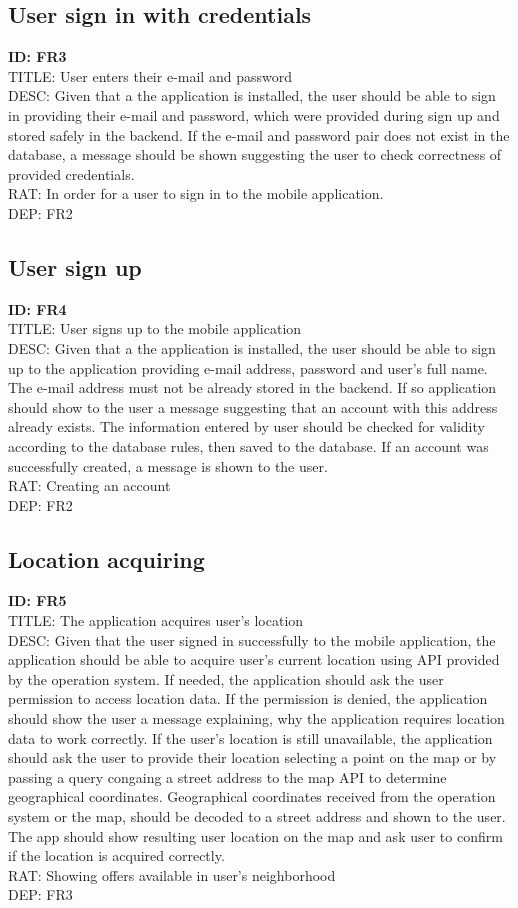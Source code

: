 \documentclass{scrreprt}
\begin{document}
\subsection{User sign in with credentials}
\textbf{ID: FR3}\\
TITLE: User enters their e-mail and password\\
DESC: Given that a the application is installed, the user should be able to sign in providing their e-mail and password, which were provided during sign up and stored safely in the backend. If the e-mail and password pair does not exist in the database, a message should be shown suggesting the user to check correctness of provided credentials.\\
RAT: In order for a user to sign in to the mobile application.\\
DEP: FR2

\subsection{User sign up}
\textbf{ID: FR4}\\
TITLE: User signs up to the mobile application\\
DESC: Given that a the application is installed, the user should be able to sign up to the application providing e-mail address, password and user's full name. The e-mail address must not be already stored in the backend. If so application should show to the user a message suggesting that an account with this address already exists. The information entered by user should be checked for validity according to the database rules, then saved to the database. If an account was successfully created, a message is shown to the user.\\
RAT: Creating an account\\
DEP: FR2

\subsection{Location acquiring}
\textbf{ID: FR5}\\
TITLE: The application acquires user's location\\
DESC: Given that the user signed in successfully to the mobile application, the application should be able to acquire user's current location using API provided by the operation system. If needed, the application should ask the user permission to access location data. If the permission is denied, the application should show the user a message explaining, why the application requires location data to work correctly. If the user's location is still unavailable, the application should ask the user to provide their location selecting a point on the map or by passing a query congaing a street address to the map API to determine geographical coordinates. Geographical coordinates received from the operation system or the map, should be decoded to a street address and shown to the user. The app should show resulting user location on the map and ask user to confirm if the location is acquired correctly.\\
RAT: Showing offers available in user's neighborhood\\
DEP: FR3
\end{document}
